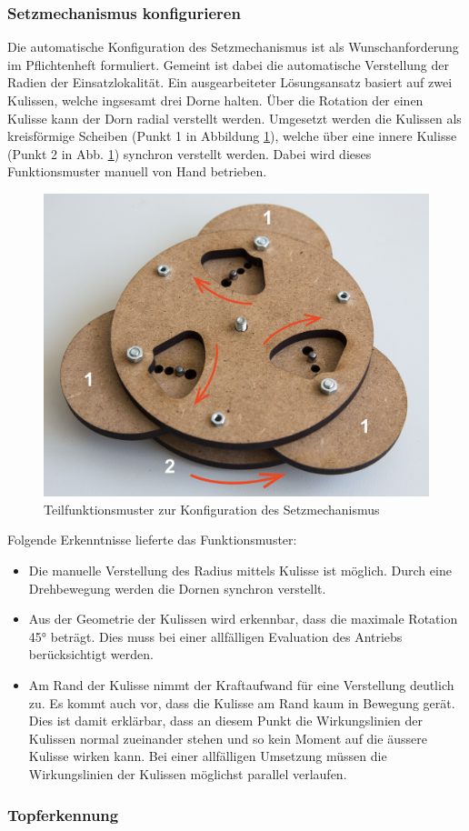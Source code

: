 \subsubsection{Setzmechanismus konfigurieren}
Die automatische Konfiguration des Setzmechanismus ist als Wunschanforderung im Pflichtenheft formuliert. Gemeint ist dabei die automatische Verstellung der Radien der Einsatzlokalität. Ein ausgearbeiteter Lösungsansatz basiert auf zwei Kulissen, welche ingsesamt drei Dorne halten. Über die Rotation der einen Kulisse kann der Dorn radial verstellt werden. Umgesetzt werden die Kulissen als kreisförmige Scheiben (Punkt 1 in Abbildung \ref{fig:setzmech_konfig}), welche über eine innere Kulisse (Punkt 2 in Abb. \ref{fig:setzmech_konfig}) synchron verstellt werden. Dabei wird dieses Funktionsmuster manuell von Hand betrieben.
\begin{figure}[H]
	\includegraphics[width=1\textwidth]{Illustrationen/5-Konzept/setzmech_konfig.jpg}
	\caption{Teilfunktionsmuster zur Konfiguration des Setzmechanismus}
	\label{fig:setzmech_konfig}
\end{figure}
Folgende Erkenntnisse lieferte das Funktionsmuster:
\begin{itemize}
	\item Die manuelle Verstellung des Radius mittels Kulisse ist möglich. Durch eine Drehbewegung werden die Dornen synchron verstellt.
	
	\item Aus der Geometrie der Kulissen wird erkennbar, dass die maximale Rotation 45° beträgt. Dies muss bei einer allfälligen Evaluation des Antriebs berücksichtigt werden.
	
	\item Am Rand der Kulisse nimmt der Kraftaufwand für eine Verstellung deutlich zu. Es kommt auch vor, dass die Kulisse am Rand kaum in Bewegung gerät. Dies ist damit erklärbar, dass an diesem Punkt die Wirkungslinien der Kulissen normal zueinander stehen und so kein Moment auf die äussere Kulisse wirken kann. Bei einer allfälligen Umsetzung müssen die Wirkungslinien der Kulissen möglichst parallel verlaufen. 
\end{itemize} 
\subsubsection{Topferkennung}